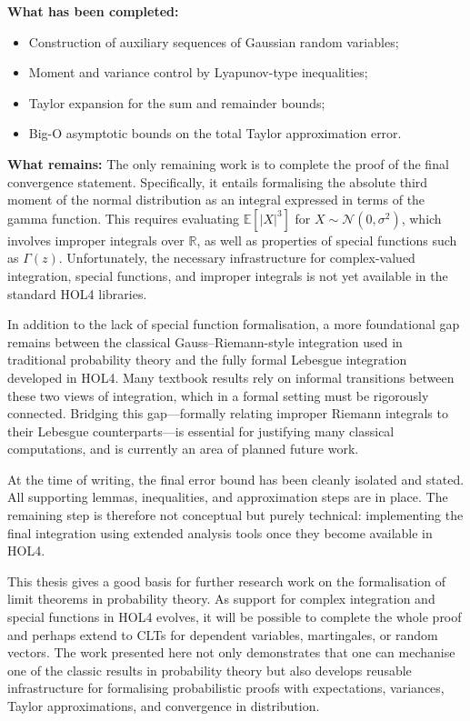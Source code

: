 \medskip

\textbf{What has been completed:}
\begin{itemize}
    \item Construction of auxiliary sequences of Gaussian random variables;
    \item Moment and variance control by Lyapunov-type inequalities;
    \item Taylor expansion for the sum and remainder bounds;
\item Big-O asymptotic bounds on the total Taylor approximation error.
\end{itemize}

\textbf{What remains:}
The only remaining work is to complete the proof of the final convergence statement. Specifically, it entails formalising the absolute third moment of the normal distribution as an integral expressed in terms of the gamma function. This requires evaluating \( \mathbb{E}[|X|^3] \) for \( X \sim \mathcal{N}(0, \sigma^2) \), which involves improper integrals over \( \mathbb{R} \), as well as properties of special functions such as \( \Gamma(z) \). Unfortunately, the necessary infrastructure for complex-valued integration, special functions, and improper integrals is not yet available in the standard HOL4 libraries.

In addition to the lack of special function formalisation, a more foundational gap remains between the classical Gauss–Riemann-style integration used in traditional probability theory and the fully formal Lebesgue integration developed in HOL4. Many textbook results rely on informal transitions between these two views of integration, which in a formal setting must be rigorously connected. Bridging this gap—formally relating improper Riemann integrals to their Lebesgue counterparts—is essential for justifying many classical computations, and is currently an area of planned future work.

At the time of writing, the final error bound has been cleanly isolated and stated. All supporting lemmas, inequalities, and approximation steps are in place. The remaining step is therefore not conceptual but purely technical: implementing the final integration using extended analysis tools once they become available in HOL4.

\medskip

\noindent
This thesis gives a good basis for further research work on the formalisation of limit theorems in probability theory. As support for complex integration and special functions in HOL4 evolves, it will be possible to complete the whole proof and perhaps extend to CLTs for dependent variables, martingales, or random vectors. The work presented here not only demonstrates that one can mechanise one of the classic results in probability theory but also develops reusable infrastructure for formalising probabilistic proofs with expectations, variances, Taylor approximations, and convergence in distribution.

